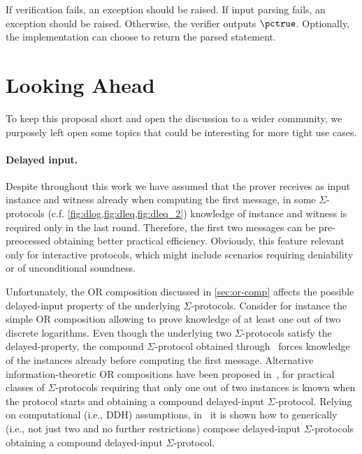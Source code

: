 \documentclass[runningheads]{llncs}
\begin{document}
If verification fails, an exception should be raised.
If input parsing fails, an exception should be raised.
Otherwise, the verifier outputs $\pctrue$. Optionally, the implementation can choose to return the parsed statement.





\section{Looking Ahead}
To keep this proposal short and open the discussion to a wider community, we purposely left open some topics that could
be interesting for more tight use cases.

\paragraph{Delayed input.}
Despite throughout this work we have assumed that the prover receives as input
instance and witness already when computing the first message, in some $\Sigma$-protocols (c.f. \cref{fig:dlog,fig:dleq,fig:dleq_2})  knowledge of instance and witness is required only in the last round. Therefore,
 the first two messages can be pre-preocessed obtaining better practical efficiency.
 Obviously, this feature relevant only for interactive protocols, which
 might include scenarios requiring deniability or of unconditional soundness.

Unfortunately, the OR composition discussed in \cref{sec:or-comp} affects the possible
delayed-input property of the underlying $\Sigma$-protocols. Consider for instance
the simple OR composition allowing to prove knowledge of at least one out of
two discrete logarithms. Even though the underlying two $\Sigma$-protocols
satisfy the delayed-property, the compound $\Sigma$-protocol obtained through~\cite{C:CraDamSch94}
forces knowledge of the instances already before computing the first message.
Alternative information-theoretic OR compositions have been proposed in~\cite{TCC:CPSSV16},
for practical classes of $\Sigma$-protocols requiring that only one out of two
instances is known when the protocol starts and obtaining a compound delayed-input
$\Sigma$-protocol. Relying on computational (i.e., DDH) assumptions, in~\cite{EC:CPSSV16} it is shown how to generically (i.e., not just two and no further restrictions) compose delayed-input $\Sigma$-protocols obtaining a compound delayed-input $\Sigma$-protocol.
\end{document}

